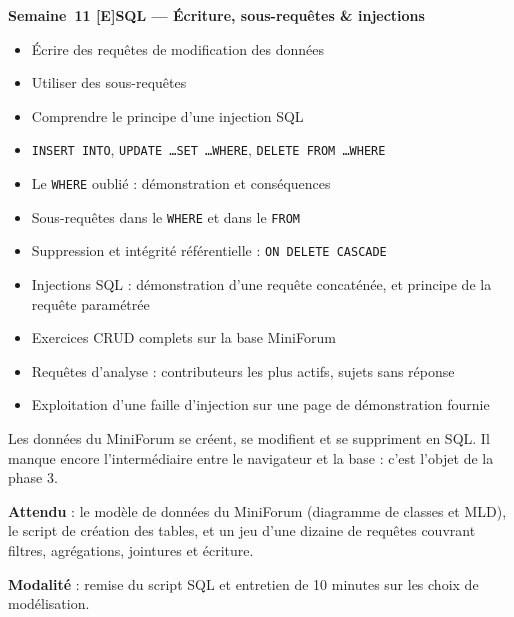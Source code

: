 \documentclass[a4paper,11pt]{article}
\newcommand{\semainetitre}[4]{%
  \needspace{9\baselineskip}%
  \vspace{8pt}
  \noindent
  \begin{tcolorbox}[
    enhanced, colback=cfptBlack, colframe=cfptBlack,
    boxrule=0pt, arc=3pt, boxsep=0pt,
    left=8pt, right=90pt, top=4pt, bottom=4pt,
    overlay={%
      \node[anchor=east, fill=cfptYellow, text=cfptBlack,
            rounded corners=2pt, inner xsep=6pt, inner ysep=3pt,
            font=\scriptsize\bfseries]
        at ([xshift=-6pt]frame.east) {#3};}
  ]
  \color{white}\bfseries\small Semaine~#1 \quad\textcolor{cfptYellow}{[#4]}\quad #2
  \end{tcolorbox}
  \vspace{-4pt}
}
\newcommand{\contenutitre}[1]{%
  \vspace{4pt}
  \noindent{\small\color{accentBlue}\textbf{#1}}\vspace{2pt}
}
\begin{document}
\semainetitre{11}{SQL --- Écriture, sous-requêtes \& injections}{3h cours / 4h TP}{E}
\begin{tcolorbox}[semaine]
\begin{tcolorbox}[objectifs]
\begin{itemize}
  \item Écrire des requêtes de modification des données
  \item Utiliser des sous-requêtes
  \item Comprendre le principe d'une injection SQL
\end{itemize}
\end{tcolorbox}
\vspace{4pt}
\contenutitre{Cours}
\begin{itemize}
  \item \texttt{INSERT INTO}, \texttt{UPDATE \dots SET \dots WHERE}, \texttt{DELETE FROM \dots WHERE}
  \item Le \texttt{WHERE} oublié : démonstration et conséquences
  \item Sous-requêtes dans le \texttt{WHERE} et dans le \texttt{FROM}
  \item Suppression et intégrité référentielle : \texttt{ON DELETE CASCADE}
  \item Injections SQL : démonstration d'une requête concaténée, et principe de la requête paramétrée
\end{itemize}
\contenutitre{Travaux pratiques}
\begin{itemize}
  \item Exercices CRUD complets sur la base MiniForum
  \item Requêtes d'analyse : contributeurs les plus actifs, sujets sans réponse
  \item Exploitation d'une faille d'injection sur une page de démonstration fournie
\end{itemize}
\end{tcolorbox}
\begin{tcolorbox}[filrouge={Le forum a une vraie mémoire}]
\small Les données du MiniForum se créent, se modifient et se suppriment en SQL. Il manque encore l'intermédiaire entre le navigateur et la base : c'est l'objet de la phase 3.
\end{tcolorbox}

\begin{tcolorbox}[jalon, title={Jalon 2 --- fin de semaine 11 (10\%)}]
\small
\textbf{Attendu} : le modèle de données du MiniForum (diagramme de classes et MLD), le script de création des tables, et un jeu d'une dizaine de requêtes couvrant filtres, agrégations, jointures et écriture.

\textbf{Modalité} : remise du script SQL et entretien de 10 minutes sur les choix de modélisation.
\end{tcolorbox}
\end{document}
